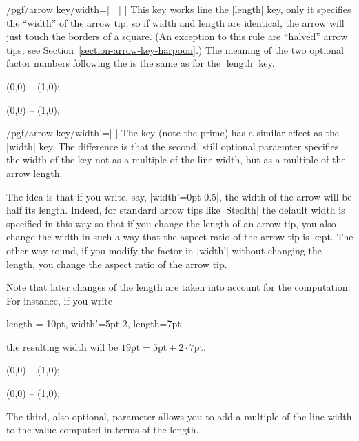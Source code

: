 \begin{key}{/pgf/arrow key/width=| |%
    | |}
  This key works line the |length| key, only it specifies the
  ``width'' of the arrow tip; so if width and length are identical, the
  arrow will just touch the borders of a square. (An exception to this
  rule are ``halved'' arrow tips, see
  Section~\ref{section-arrow-key-harpoon}.) The meaning of the two
  optional factor numbers following the  is the same
  as for the |length| key.
\begin{codeexample}[]
\tikz \draw [arrows = {-Latex[width=10pt, length=10pt]}] (0,0) -- (1,0);
\end{codeexample}
\begin{codeexample}[]
\tikz \draw [arrows = {-Latex[width=0pt 10, length=10pt]}] (0,0) -- (1,0);
\end{codeexample}
\end{key}

\begin{key}{/pgf/arrow key/width'=| |}
  The key (note the prime) has a similar effect as the |width|
  key. The difference is that the second, still optional paraemter
   specifies the width of the key not as a
  multiple of the line width, but as a multiple of the arrow length.

  The idea is that if you write, say, |width'=0pt 0.5|, the width of
  the arrow will be half its length. Indeed, for standard arrow tips
  like |Stealth| the default width is specified in this way so that if
  you change the length of an arrow tip, you also change the width in
  such a way that the aspect ratio of the arrow tip is kept. The other
  way round, if you modify the factor in |width'| without changing the
  length, you change the aspect ratio of the arrow tip.

  Note that later changes of the length are taken into account for the
  computation. For instance, if you write
\begin{codeexample}
length = 10pt, width'=5pt 2, length=7pt    
\end{codeexample}
  the resulting width will be $19\mathrm{pt} = 5\mathrm{pt} + 2\cdot
  7\mathrm{pt}$.

\begin{codeexample}[]
\tikz \draw [arrows = {-Latex[width'=0pt .5, length=10pt]}] (0,0) -- (1,0);
\end{codeexample}
\begin{codeexample}[]
\tikz \draw [arrows = {-Latex[width'=0pt .5, length=15pt]}] (0,0) -- (1,0);
\end{codeexample}
  The third, also optional, parameter allows you to add a multiple of
  the line width to the value computed in terms of the length.
\end{key}


